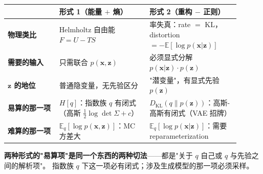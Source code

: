 \documentclass[12pt, a4paper]{ctexart}
\begin{document}
\begin{blackboard}[形式 1 vs 形式 2：四个维度的对照]

\begin{center}
\renewcommand{\arraystretch}{1.3}
\begin{tabular}{p{0.20\linewidth}|p{0.35\linewidth}|p{0.35\linewidth}}
\toprule
 & \textbf{形式 1（能量 $+$ 熵）} & \textbf{形式 2（重构 $-$ 正则）} \\
\midrule
\textbf{物理类比} & Helmholtz 自由能 $F = U - TS$ & 率失真：rate $=$ KL，distortion $= -\mathbb{E}[\log p(\mathbf{x}|\mathbf{z})]$ \\
\midrule
\textbf{需要的输入} & 只需联合 $p(\mathbf{x}, \mathbf{z})$ & 必须显式分解 $p(\mathbf{x}|\mathbf{z}) \cdot p(\mathbf{z})$ \\
\midrule
\textbf{$\mathbf{z}$ 的地位} & 普通隐变量，无先验区分 & "潜变量"，有显式先验 $p(\mathbf{z})$ \\
\midrule
\textbf{易算的那一项} & $H[q]$：指数族 $q$ 有闭式（高斯 $\tfrac{1}{2}\log\det\Sigma + c$） & $D_{\mathrm{KL}}(q\|p(\mathbf{z}))$：高斯-高斯有闭式（VAE 招牌） \\
\midrule
\textbf{难算的那一项} & $\mathbb{E}_q[\log p(\mathbf{x},\mathbf{z})]$：MC 方差大 & $\mathbb{E}_q[\log p(\mathbf{x}|\mathbf{z})]$：需要 reparameterization \\
\bottomrule
\end{tabular}
\end{center}

\textbf{两种形式的"易算项"是同一个东西的两种切法}——都是"关于 $q$ 自己或 $q$ 与先验之间的解析项"。
指数族 $q$ 下这一项必有闭式；涉及生成模型的那一项必须采样。

\end{blackboard}
\end{document}
